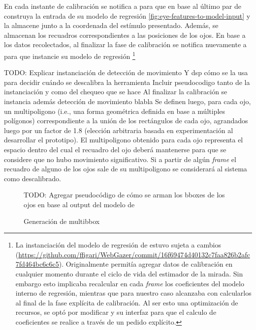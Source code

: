   En cada instante de calibración se notifica a \webgazer para que en base al
  último par de \features construya la entrada de su modelo de regresión
  \ref{fig:eye-features-to-model-input} y la almacene junto a la coordenada del
  estímulo presentado.
  Además, se almacenan los recuadros correspondientes a las posiciones de los
  ojos.
  En base a los datos recolectados, al finalizar la fase de calibración se
  notifica nuevamente a \webgazer para que instancie su modelo de regresión
  \footnote{
    La instanciación del modelo de regresión de \webgazer estuvo sujeta a
    cambios
    (\url{https://github.com/ffigari/WebGazer/commit/16f69474d40132c7faa826b2afc7fd464bc6c6c5}).
    Originalmente \webgazer permitía agregar datos de calibración en cualquier
    momento durante el ciclo de vida del estimador de la mirada.
    Sin embargo esto implicaba recalcular en cada \textit{frame} los coeficientes
    del modelo interno de regresión, mientras que para nuestro caso alcanzaba con
    calcularlos al final de la fase explícita de calibración.
    Al ser esto una optimización de recursos, se optó por modificar \webgazer y su
    interfaz para que el calculo de coeficientes se realice a través de un pedido
    explícito.
  }

  TODO: Explicar instanciación de detección de movimiento
        Y dsp cómo se la usa para decidir cuándo se descalibra la herramienta
        Incluir pseudocodigo tanto de la instanciación y como del chequeo que se
        hace
  Al finalizar la calibración se instancia además detección de movimiento blabla
  Se definen luego, para cada ojo, un multipoligono (i.e., una forma geométrica
  definida en base a múltiples polígonos) correspondiente a la unión de los
  rectángulos de cada ojo, agrandados luego por un factor de 1.8 (elección
  arbitraria basada en experimentación al desarrollar el prototipo).
  El multipoligono obtenido para cada ojo representa el espacio dentro del cual
  el recuadro del ojo deberá mantenerse para que se considere que no hubo
  movimiento significativo.
  Si a partir de algún \textit{frame} el recuadro de alguno de los ojos sale de
  su multipoligono se considerará al sistema como descalibrado.

  \begin{figure}
    TODO: Agregar pseudocódigo de cómo se arman los bboxes de los ojos en base al
          output del modelo de \facemesh

    \caption{Generación de multibbox}
    \label{fig:facemesh-to-eyes-bbox}
  \end{figure}


